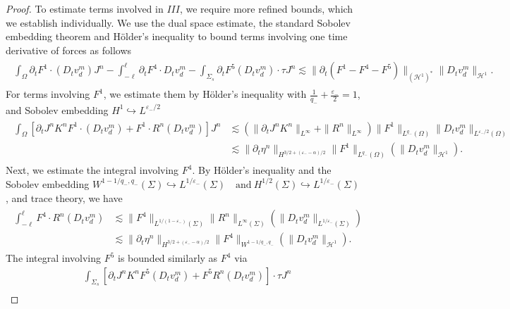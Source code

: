 \documentclass[letterpaper,reqno,10pt,twoside]{amsart}
\theoremstyle{definition}
\theoremstyle{remark}
\def\p{\partial}
\def\Om{\Omega}
\def\f{\frac}
\begin{document}
\begin{proof}
		To estimate terms involved in $III$, we require more refined bounds, which we establish individually. We use the dual space estimate, the standard Sobolev embedding theorem and H\"older's inequality to bound terms involving one time derivative of forces as follows
		\begin{align}
			\begin{aligned}
				\int_{\Om}\p_tF^1\cdot(D_{t}v_{d}^{m})J^{n}-\int_{-\ell}^{\ell}\p_tF^4\cdot D_{t}v_{d}^{m}-\int_{\Sigma_s}\p_tF^5(D_{t}v_{d}^{m})\cdot\tau J^{n}
				\lesssim \|\p_t(F^1-F^4-F^5)\|_{(\mathcal{H}^1)^{\ast}}\|D_{t}v_{d}^m\|_{\mathcal{H}^1}.
			\end{aligned}
		\end{align}
		For terms involving $F^1$, we estimate them by H\"older's inequality with $\f1{q_-}+\f{\varepsilon_-}2=1$, and Sobolev embedding $H^1\hookrightarrow L^{\varepsilon_-/2}$
		\begin{align}
			\begin{aligned}
				\int_{\Om}\left[\p_tJ^{n}K^{n}F^1\cdot(D_{t}v_{d}^{m})+F^1\cdot R^{n}(D_{t}v_{d}^{m})\right]J^{n}
				&\lesssim (\|\p_tJ^{n}K^{n}\|_{L^\infty}+\|R^{n}\|_{L^\infty})\|F^1\|_{L^{q_-}(\Om)}\|D_tv_{d}^m\|_{L^{\varepsilon_-/2}(\Om)}\\
				&\lesssim\|\p_t\eta^{n}\|_{H^{3/2+(\varepsilon_--\alpha)/2}}\|F^1\|_{L^{q_-}(\Om)}(\|D_tv_{d}^m\|_{\mathcal{H}^1}).
			\end{aligned}
		\end{align}
		Next, we estimate the integral involving $F^4$. By H\"older's inequality and the Sobolev embedding
		$
		W^{1-1/q_-, q_-}(\Sigma)\hookrightarrow L^{1/\varepsilon_-}(\Sigma)\quad \text{and} \ H^{1/2}(\Sigma)\hookrightarrow L^{1/\varepsilon_-}(\Sigma)$,
		and trace theory, we have
		\begin{align}
			\begin{aligned}
				\int_{-\ell}^{\ell}F^4\cdot R^{n}(D_{t}v_{d}^{m})&\lesssim \|F^4\|_{L^{1/(1-\varepsilon_-)}(\Sigma)}\|R^{n}\|_{L^\infty(\Sigma)}(\|D_tv_{d}^m\|_{L^{1/\varepsilon_-}(\Sigma)})\\
				&\lesssim\|\p_t\eta^{n}\|_{H^{3/2+(\varepsilon_--\alpha)/2}}\|F^4\|_{W^{1-1/q_-, q_-}}(\|D_tv_{d}^m\|_{\mathcal{H}^1}).
			\end{aligned}
		\end{align}
		The integral involving $F^5$ is bounded similarly as $F^4$ via
		\begin{equation}\label{est:iii}
			\begin{aligned}
				&\int_{\Sigma_s}\left[\p_tJ^{n}K^{n}F^5(D_{t}v_{d}^{m})+F^5 R^{n}(D_{t}v_{d}^{m})\right]\cdot\tau J^{n}\\

\end{aligned}
\end{equation}
\end{proof}
\end{document}
